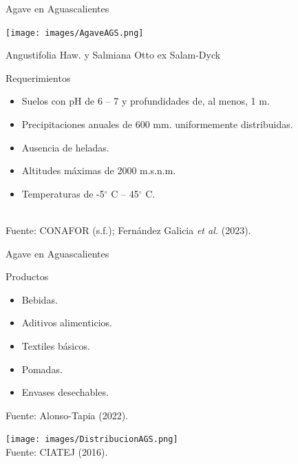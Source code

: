 \documentclass[aspectratio=169]{beamer}
\begin{document}
\begin{frame}{Agave en Aguascalientes}
    \vspace{-1cm}
    \begin{minipage}{0.5\textwidth}
			\hspace{-0.5cm}\texttt{[image: images/AgaveAGS.png]}
		\end{minipage}%
		\begin{minipage}{0.5\textwidth}
			\begin{block}{Angustifolia Haw. y Salmiana Otto ex Salam-Dyck}
			\end{block}
            \pause\begin{block}{Requerimientos}
                \begin{itemize}
				\item Suelos con pH de 6 -- 7 y profundidades de, al menos, 1 m.
                    \item Precipitaciones anuales de 600 mm. uniformemente distribuidas.
                    \item Ausencia de heladas.
                    \item Altitudes máximas de 2000 m.s.n.m.
                    \item Temperaturas de -5$^\circ$ C -- 45$^\circ$ C. 
			\end{itemize}
            \end{block}
		\end{minipage}
        \,\\
        \hfill {\scriptsize Fuente: CONAFOR (s.f.);  Fernández Galicia \textit{et al.} (2023).}
\end{frame}


\begin{frame}{Agave en Aguascalientes}
	\vspace{-1cm}
	\begin{minipage}{0.5\textwidth}
		\begin{block}{Productos}
			\begin{itemize}
				\item Bebidas.
				\item Aditivos alimenticios.
				\item Textiles básicos.
				\item Pomadas.
				\item Envases desechables.
			\end{itemize}
			{\scriptsize Fuente: Alonso-Tapia (2022).}
		\end{block}
	\end{minipage}%
	\begin{minipage}{0.5\textwidth}
		\centering\texttt{[image: images/DistribucionAGS.png]}\\\hfill {\scriptsize Fuente: CIATEJ (2016).}
	\end{minipage}%
\end{frame}
\end{document}
